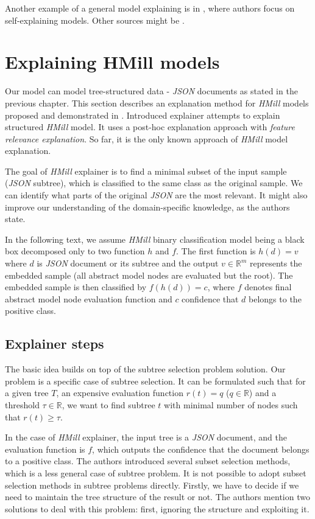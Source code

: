 Another example of a general model explaining is in \cite{Alvarez-Melis2018}, where authors focus on self-explaining models. Other sources might be \cite{Strumbelj2013,Robnik-Sikonja2008,Montavon2018}.

\section{Explaining HMill models}
Our model can model tree-structured data - \emph{JSON} documents as stated in the previous chapter. This section describes an explanation method for \emph{HMill} models proposed and demonstrated in \cite{Pevny2020}. Introduced explainer attempts to explain structured \emph{HMill} model. It uses a post-hoc explanation approach with \emph{feature relevance explanation}. So far, it is the only known approach of \emph{HMill} model explanation.

The goal of \emph{HMill} explainer is to find a minimal subset of the input sample (\emph{JSON} subtree), which is classified to the same class as the original sample. We can identify what parts of the original \emph{JSON} are the most relevant. It might also improve our understanding of the domain-specific knowledge, as the authors state.

In the following text, we assume \emph{HMill} binary classification model being a black box decomposed only to two function $h$ and $f$. The first function is $h(d)=v$ where $d$ is \emph{JSON} document or its subtree and the output $v\in\mathbb{R}^{m}$ represents the embedded sample (all abstract model nodes are evaluated but the root). The embedded sample is then classified by $f(h(d))=c$, where $f$ denotes final abstract model node evaluation function and $c$ confidence that $d$ belongs to the positive class.

\subsection{Explainer steps}
The basic idea builds on top of the subtree selection problem solution. Our problem is a specific case of subtree selection. It can be formulated such that for a given tree $T$, an expensive evaluation function $r(t)=q$ ($q\in\mathbb{R}$) and a threshold $\tau\in\mathbb{R}$, we want to find subtree $t$ with minimal number of nodes such that $r(t)\geq\tau$. 

In the case of \emph{HMill} explainer, the input tree is a \emph{JSON} document, and the evaluation function is $f$, which outputs the confidence that the document belongs to a positive class. The authors introduced several subset selection methods, which is a less general case of subtree problem. It is not possible to adopt subset selection methods in subtree problems directly. Firstly, we have to decide if we need to maintain the tree structure of the result or not. The authors mention two solutions to deal with this problem: first, ignoring the structure and exploiting it.

